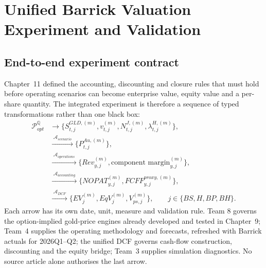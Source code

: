 \chapter{Unified Barrick Valuation Experiment and Validation}

\section{End-to-end experiment contract}

Chapter~11 defined the accounting, discounting and closure rules that must hold
before operating scenarios can become enterprise value, equity value and a
per-share quantity. The integrated experiment is therefore a sequence of typed
transformations rather than one black box:
\begin{align}
\mathcal P_{opt}^{\mathbb Q}
&\longrightarrow
\{S_{t,j}^{GLD,(m)},v_{t,j}^{(m)},N_{t,j}^{J,(m)},
\lambda_{t,j}^{H,(m)}\},\\
&\xrightarrow{\;\mathcal A_{scenario}\;}
\{P_{t,j}^{Au,(m)}\},\\
&\xrightarrow{\;\mathcal A_{operations}\;}
\{Rev_{y,j}^{(m)},\text{component margin}_{y,j}^{(m)}\},\\
&\xrightarrow{\;\mathcal A_{accounting}\;}
\{NOPAT_{y,j}^{(m)},FCFF_{y,j}^{proxy,(m)}\},\\
&\xrightarrow{\;\mathcal A_{DCF}\;}
\{EV_j^{(m)},EqV_j^{(m)},V_{ps,j}^{(m)}\},
\qquad j\in\{BS,H,BP,BH\}.
\end{align}
Each arrow has its own date, unit, measure and validation rule. Team 8 governs
the option-implied gold-price engines already developed and tested in
Chapter~9; Team~4 supplies the operating methodology and forecasts, refreshed
with Barrick actuals for 2026Q1--Q2; the unified DCF governs cash-flow
construction, discounting and the equity bridge; Team~3 supplies simulation
diagnostics. No source article alone authorises the last arrow.


